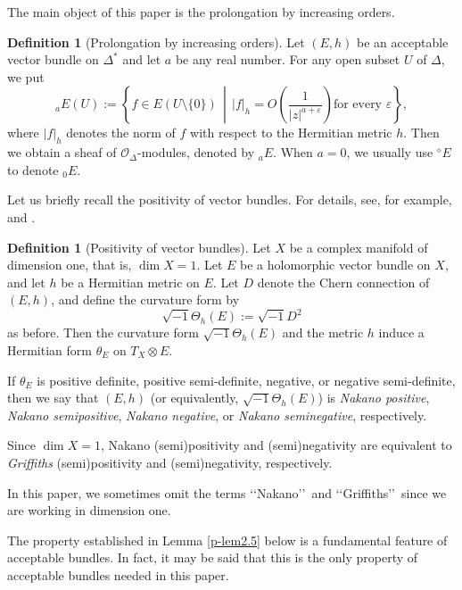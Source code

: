 \documentclass[12pt,twoside]{amsart}
\theoremstyle{definition}
\newtheorem{defn}[thm]{Definition}
\begin{document}
The main object of this paper is the prolongation by 
increasing orders. 

\begin{defn}[Prolongation by increasing orders]\label{p-def2.3}
Let $(E, h)$ be an acceptable vector bundle on $\Delta^*$ and let 
$a$ be any real number. 
For any open subset $U$ of $\Delta$, 
we put 
\[
{}_aE(U):=\left\{f\in 
E(U\setminus \{0\})\, 
\middle|\,  |f|_h=O\left(\frac{1}{|z|^{a+\varepsilon}}\right) \text{for 
every $\varepsilon$}\right\},  
\] 
where $|f|_h$ denotes the norm of $f$ with 
respect to the Hermitian metric $h$. 
Then we obtain a sheaf of \( \mathcal{O}_\Delta \)-modules, 
denoted by \( {}_a E \). 
When $a=0$, we usually use ${}^\diamond\! E$ to denote 
${}_0E$. 
\end{defn}

Let us briefly recall the positivity of vector bundles. 
For details, see, for example, \cite[Chapter 10]{demailly1} 
and \cite[Chapter VII, \S 6 Positivity Concepts for Vector Bundles]{demailly}. 

\begin{defn}[Positivity of vector bundles]\label{p-def2.4}
Let $X$ be a complex manifold of dimension one, that is, $\dim X = 1$.  
Let $E$ be a holomorphic vector bundle on $X$, and let $h$ be a Hermitian metric on $E$.  
Let $D$ denote the Chern connection of $(E, h)$, and define the curvature form by
\[
\sqrt{-1} \Theta_h(E) := \sqrt{-1} D^2
\] 
as before. 
Then the curvature form $\sqrt{-1}\Theta_h(E)$ and the metric $h$ induce 
a Hermitian form $\theta_E$ on $T_X \otimes E$.

If $\theta_E$ is positive definite, positive semi-definite, negative, or negative semi-definite,  
then we say that $(E, h)$ (or equivalently, 
$\sqrt{-1}\Theta_h(E)$) is  
\emph{Nakano positive}, \emph{Nakano semipositive}, 
\emph{Nakano negative}, or \emph{Nakano seminegative}, respectively.

Since $\dim X = 1$, Nakano (semi)positivity and (semi)negativity are equivalent to  
\emph{Griffiths} (semi)positivity and (semi)negativity, respectively.

In this paper, we sometimes omit the 
terms \lq\lq Nakano\rq\rq \ and \lq\lq Griffiths\rq\rq \ since we are working 
in dimension one.
\end{defn}

The property established in 
Lemma \ref{p-lem2.5} below is a fundamental feature of 
acceptable bundles.
In fact, it may be said that this is the only 
property of acceptable bundles needed in this paper.
\end{document}

